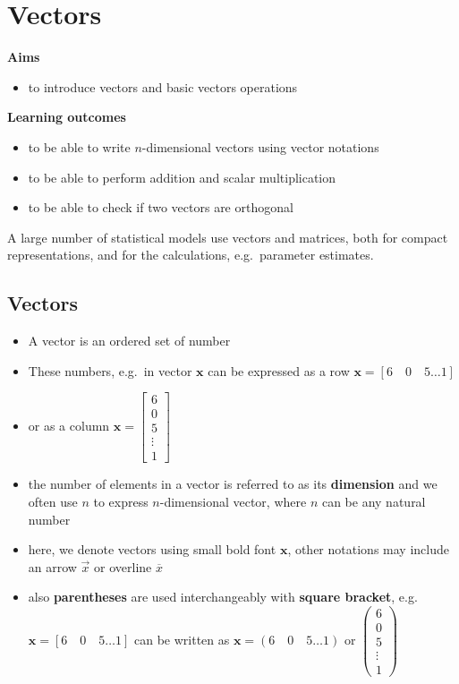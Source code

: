 \documentclass[
]{book}
\providecommand{\tightlist}{%
  \setlength{\itemsep}{0pt}\setlength{\parskip}{0pt}}
\theoremstyle{definition}
\theoremstyle{definition}
\theoremstyle{definition}
\theoremstyle{remark}
\begin{document}
\hypertarget{vectors}{%
\chapter{Vectors}\label{vectors}}

\textbf{Aims}

\begin{itemize}
\tightlist
\item
  to introduce vectors and basic vectors operations
\end{itemize}

\textbf{Learning outcomes}

\begin{itemize}
\tightlist
\item
  to be able to write \(n\)-dimensional vectors using vector notations
\item
  to be able to perform addition and scalar multiplication
\item
  to be able to check if two vectors are orthogonal
\end{itemize}

A large number of statistical models use vectors and matrices, both for compact representations, and for the calculations, e.g.~parameter estimates.

\hypertarget{vectors-1}{%
\section{Vectors}\label{vectors-1}}

\begin{itemize}
\tightlist
\item
  A vector is an ordered set of number
\item
  These numbers, e.g.~in vector \(\mathbf{x}\) can be expressed as a row \(\mathbf{x}=[6\quad 0\quad 5 \dots1]\)
\item
  or as a column \(\mathbf{x}=\begin{bmatrix} 6 \\ 0 \\ 5 \\ \vdots \\ 1 \end{bmatrix}\)
\item
  the number of elements in a vector is referred to as its \textbf{dimension} and we often use \(n\) to express \(n\)-dimensional vector, where \(n\) can be any natural number
\item
  here, we denote vectors using small bold font \(\mathbf{x}\), other notations may include an arrow \(\vec x\) or overline \(\overline{x}\)
\item
  also \textbf{parentheses} are used interchangeably with \textbf{square bracket}, e.g.~\(\mathbf{x}=[6\quad 0\quad 5 \dots1]\) can be written as \(\mathbf{x}=(6\quad 0\quad 5 \dots1)\) or \(\begin{pmatrix} 6\\ 0\\ 5\\ \vdots \\ 1 \end{pmatrix}\)
\end{itemize}
\end{document}
